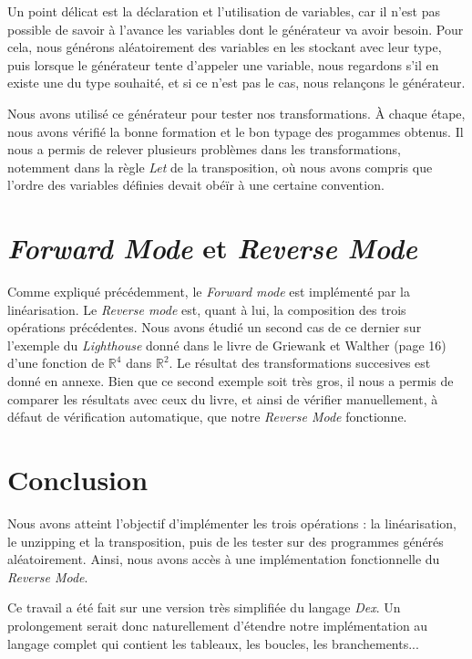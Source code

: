 \documentclass[a4paper, french, 11pt]{article}
\begin{document}
Un point délicat est la déclaration et l'utilisation de variables, car il n'est pas possible de savoir à l'avance les variables dont le générateur va avoir besoin. Pour cela, nous générons aléatoirement des variables en les stockant avec leur type, puis lorsque le générateur tente d'appeler une variable, nous regardons s'il en existe une du type souhaité, et si ce n'est pas le cas, nous relançons le générateur.

Nous avons utilisé ce générateur pour tester nos transformations. À chaque étape, nous avons vérifié la bonne formation et le bon typage des progammes obtenus. Il nous a permis de relever plusieurs problèmes dans les transformations, notemment dans la règle \textit{Let} de la transposition, où nous avons compris que l'ordre des variables définies devait obéïr à une certaine convention.




\section{\textit{Forward Mode} et \textit{Reverse Mode}}

Comme expliqué précédemment, le \textit{Forward mode} est implémenté par la linéarisation. Le \textit{Reverse mode} est, quant à lui, la composition des trois opérations précédentes.
Nous avons étudié un second cas de ce dernier sur l'exemple du \textit{Lighthouse} donné dans le livre de Griewank et Walther (page 16) d'une fonction de $\mathbb{R}^4$ dans $\mathbb{R}^2$. Le résultat des transformations succesives est donné en annexe. Bien que ce second exemple soit très gros, il nous a permis de comparer les résultats avec ceux du livre, et ainsi de vérifier manuellement, à défaut de vérification automatique, que notre \textit{Reverse Mode} fonctionne.

  



\section{Conclusion}

Nous avons atteint l'objectif d'implémenter les trois opérations : la linéarisation, le unzipping et la transposition, puis de les tester sur des programmes générés aléatoirement. Ainsi, nous avons accès à une implémentation fonctionnelle du \textit{Reverse Mode}. 

Ce travail a été fait sur une version très simplifiée du langage \textit{Dex}. Un prolongement serait donc naturellement d'étendre notre implémentation au langage complet qui contient les tableaux, les boucles, les branchements...
\end{document}

